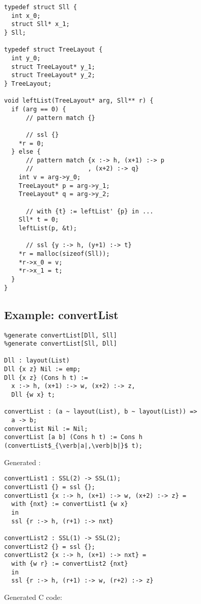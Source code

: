 \begin{lstlisting}
typedef struct Sll {
  int x_0;
  struct Sll* x_1;
} Sll;

typedef struct TreeLayout {
  int y_0;
  struct TreeLayout* y_1;
  struct TreeLayout* y_2;
} TreeLayout;

void leftList(TreeLayout* arg, Sll** r) {
  if (arg == 0) {
      // pattern match {}

      // ssl {}
    *r = 0;
  } else {
      // pattern match {x :-> h, (x+1) :-> p
      //               , (x+2) :-> q}
    int v = arg->y_0;
    TreeLayout* p = arg->y_1;
    TreeLayout* q = arg->y_2;

      // with {t} := leftList' {p} in ...
    Sll* t = 0;
    leftList(p, &t);

      // ssl {y :-> h, (y+1) :-> t}
    *r = malloc(sizeof(Sll));
    *r->x_0 = v;
    *r->x_1 = t;
  }
}
\end{lstlisting}


\subsection{Example: convertList}

\begin{lstlisting}
%generate convertList[Dll, Sll]
%generate convertList[Sll, Dll]

Dll : layout(List)
Dll {x z} Nil := emp;
Dll {x z} (Cons h t) :=
  x :-> h, (x+1) :-> w, (x+2) :-> z,
  Dll {w x} t;

convertList : (a ~ layout(List), b ~ layout(List)) =>
  a -> b;
convertList Nil := Nil;
convertList [a b] (Cons h t) := Cons h (convertList$_{\verb|a|,\verb|b|}$ t);
\end{lstlisting}

Generated \PikaCore:

\begin{lstlisting}
convertList1 : SSL(2) -> SSL(1);
convertList1 {} = ssl {};
convertList1 {x :-> h, (x+1) :-> w, (x+2) :-> z} =
  with {nxt} := convertList1 {w x}
  in
  ssl {r :-> h, (r+1) :-> nxt}

convertList2 : SSL(1) -> SSL(2);
convertList2 {} = ssl {};
convertList2 {x :-> h, (x+1) :-> nxt} =
  with {w r} := convertList2 {nxt}
  in
  ssl {r :-> h, (r+1) :-> w, (r+2) :-> z}
\end{lstlisting}

Generated C code:

